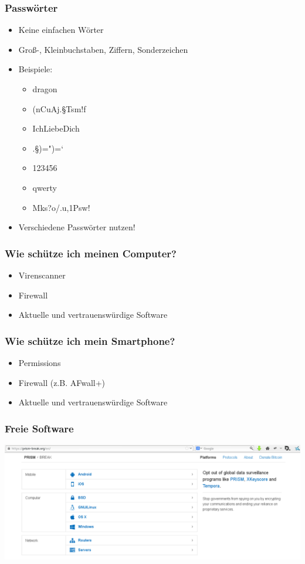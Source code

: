\documentclass[12pt]{beamer}
\begin{document}
\begin{frame}
    \frametitle{Passwörter}
    \begin{itemize}
        \item<2-> Keine einfachen Wörter
        \item<3-> Groß-, Kleinbuchstaben, Ziffern, Sonderzeichen
        \item<4-> Beispiele:
            \begin{itemize}
                \item<5-> dragon
                \item<6-> (nCuAj.§Tsm!f
                \item<7-> IchLiebeDich
                \item<8-> .§)=")=`
                \item<9-> 123456
                \item<10-> qwerty
                \item<11-> Mks?o/.u,1Psw!
            \end{itemize}
        \item<12-> Verschiedene Passwörter nutzen!
    \end{itemize}
\end{frame}

\begin{frame}
    \frametitle{Wie schütze ich meinen Computer?}
    \begin{itemize}
      \item Virenscanner
      \item Firewall
      \item Aktuelle und vertrauenswürdige Software
    \end{itemize}
\end{frame}

\begin{frame}
    \frametitle{Wie schütze ich mein Smartphone?}
    \begin{itemize}
      \item Permissions
      \item Firewall (z.B. AFwall+)
      \item Aktuelle und vertrauenswürdige Software
    \end{itemize}
\end{frame}

\begin{frame}
    \frametitle{Freie Software}
    \includegraphics[height=0.7\textheight]{img/prism-break1.png}
\end{frame}
\end{document}
